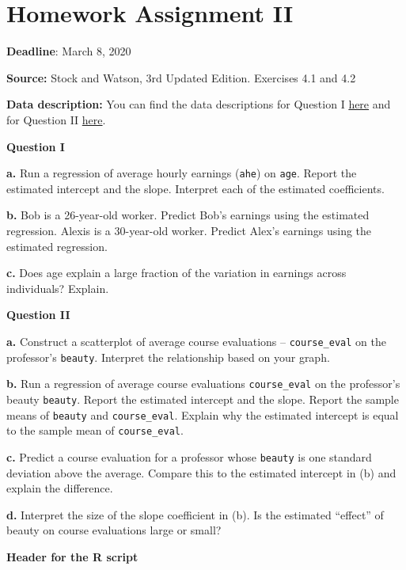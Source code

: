 \documentclass[]{book}
\begin{document}
\chapter{Homework Assignment II}\label{homework-assignment-ii}

\textbf{Deadline}: March 8, 2020

\textbf{Source:} Stock and Watson, 3rd Updated Edition. Exercises 4.1
and 4.2

\textbf{Data description:} You can find the data descriptions for
Question I
\href{https://wps.pearsoned.com/wps/media/objects/11422/11696965/empirical/empex_tb/CPS08_Description.pdf}{here}
and for Question II
\href{https://wps.pearsoned.com/wps/media/objects/11422/11696965/empirical/empex_tb/TeachingRatings_Description.pdf}{here}.

\textbf{Question I}

\textbf{a.} Run a regression of average hourly earnings (\texttt{ahe})
on \texttt{age}. Report the estimated intercept and the slope. Interpret
each of the estimated coefficients.

\textbf{b.} Bob is a 26-year-old worker. Predict Bob's earnings using
the estimated regression. Alexis is a 30-year-old worker. Predict Alex's
earnings using the estimated regression.

\textbf{c.} Does age explain a large fraction of the variation in
earnings across individuals? Explain.

\textbf{Question II}

\textbf{a.} Construct a scatterplot of average course evaluations --
\texttt{course\_eval} on the professor's \texttt{beauty}. Interpret the
relationship based on your graph.

\textbf{b.} Run a regression of average course evaluations
\texttt{course\_eval} on the professor's beauty \texttt{beauty}. Report
the estimated intercept and the slope. Report the sample means of
\texttt{beauty} and \texttt{course\_eval}. Explain why the estimated
intercept is equal to the sample mean of \texttt{course\_eval}.

\textbf{c.} Predict a course evaluation for a professor whose
\texttt{beauty} is one standard deviation above the average. Compare
this to the estimated intercept in (b) and explain the difference.

\textbf{d.} Interpret the size of the slope coefficient in (b). Is the
estimated ``effect'' of beauty on course evaluations large or small?

\textbf{Header for the R script}
\end{document}
